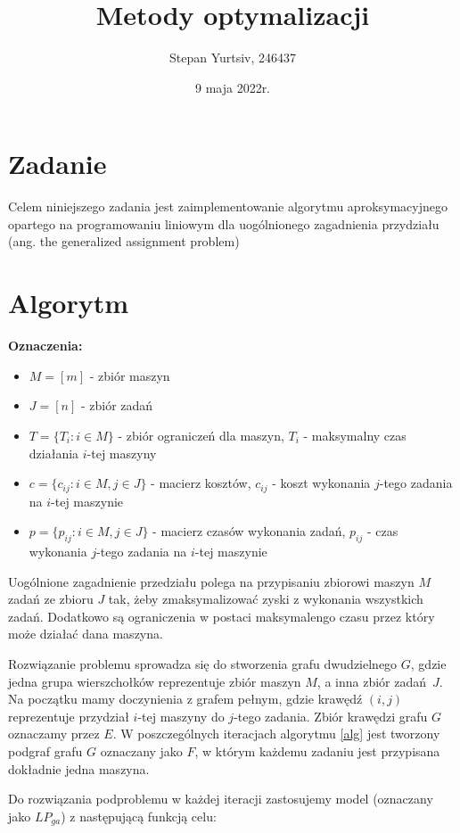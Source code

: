 \documentclass[12pt, a4paper]{article}
\title{Metody optymalizacji}
\author{Stepan Yurtsiv, 246437}
\date{9 maja 2022r.}
\begin{document}
\maketitle

\section*{Zadanie}

Celem niniejszego zadania jest zaimplementowanie algorytmu
aproksymacyjnego opartego na programowaniu liniowym dla
uogólnionego zagadnienia przydziału (ang. the generalized assignment problem)

\section*{Algorytm}

\textbf{Oznaczenia:}
\begin{itemize}
  \item $M = [m]$ - zbiór maszyn
  \item $J = [n]$ - zbiór zadań
  \item $T = \{T_i: i \in M\}$ - zbiór ograniczeń dla maszyn, $T_i$ - maksymalny czas działania $i$-tej maszyny
  \item $c = \{c_{ij}: i \in M, j \in J\}$ - macierz kosztów, $c_{ij}$ - koszt wykonania $j$-tego zadania na $i$-tej maszynie
  \item $p = \{p_{ij}: i \in M, j \in J\}$ - macierz czasów wykonania zadań, $p_{ij}$ - czas wykonania $j$-tego zadania na $i$-tej maszynie
\end{itemize}

Uogólnione zagadnienie przedziału polega na przypisaniu zbiorowi maszyn
$M$ zadań ze zbioru $J$ tak, żeby zmaksymalizować zyski z wykonania wszystkich
zadań. Dodatkowo są ograniczenia w postaci maksymalengo czasu przez który może
działać dana maszyna.

Rozwiązanie problemu sprowadza się do stworzenia grafu dwudzielnego
$G$, gdzie jedna grupa wierszchołków reprezentuje zbiór maszyn $M$, a inna
zbiór zadań $J$. Na początku mamy doczynienia z grafem pełnym, gdzie krawędź $(i, j)$ reprezentuje
przydział $i$-tej maszyny do $j$-tego zadania. Zbiór krawędzi
grafu $G$ oznaczamy przez $E$. W poszczególnych iteracjach
algorytmu \ref{alg} jest tworzony podgraf grafu $G$ oznaczany jako $F$, w którym
każdemu zadaniu jest przypisana dokładnie jedna maszyna.

Do rozwiązania podproblemu w każdej iteracji zastosujemy model (oznaczany jako $LP_{ga}$) z następującą 
funkcją celu:
\end{document}
